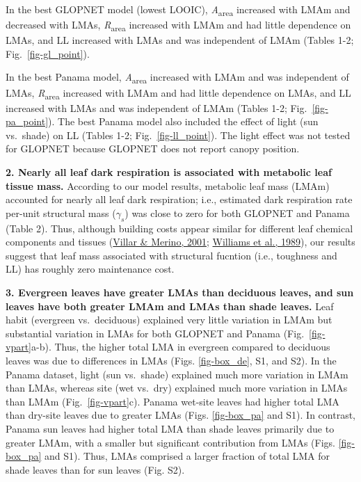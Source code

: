 \documentclass[
  12pt,
  letterpaper,
  DIV=11,
  numbers=noendperiod]{scrartcl}
\begin{document}
In the best GLOPNET model (lowest LOOIC), \emph{A}\textsubscript{area}
increased with LMAm and decreased with LMAs,
\emph{R}\textsubscript{area} increased with LMAm and had little
dependence on LMAs, and LL increased with LMAs and was independent of
LMAm (Tables 1-2; Fig.~\ref{fig-gl_point}).

In the best Panama model, \emph{A}\textsubscript{area} increased with
LMAm and was independent of LMAs, \emph{R}\textsubscript{area} increased
with LMAm and had little dependence on LMAs, and LL increased with LMAs
and was independent of LMAm (Tables 1-2; Fig.~\ref{fig-pa_point}). The
best Panama model also included the effect of light (sun vs.~shade) on
LL (Tables 1-2; Fig.~\ref{fig-ll_point}). The light effect was not
tested for GLOPNET because GLOPNET does not report canopy position.

\textbf{2. Nearly all leaf dark respiration is associated with metabolic
leaf tissue mass.} According to our model results, metabolic leaf mass
(LMAm) accounted for nearly all leaf dark respiration; i.e., estimated
dark respiration rate per-unit structural mass (\(\gamma_s\)) was close
to zero for both GLOPNET and Panama (Table 2). Thus, although building
costs appear similar for different leaf chemical components and tissues
(\protect\hyperlink{ref-Villar2001}{Villar \& Merino, 2001};
\protect\hyperlink{ref-Williams1989}{Williams et al., 1989}), our
results suggest that leaf mass associated with structural fucntion
(i.e., toughness and LL) has roughly zero maintenance cost.

\textbf{3. Evergreen leaves have greater LMAs than deciduous leaves, and
sun leaves have both greater LMAm and LMAs than shade leaves.} Leaf
habit (evergreen vs.~deciduous) explained very little variation in LMAm
but substantial variation in LMAs for both GLOPNET and Panama
(Fig.~\ref{fig-vpart}a-b). Thus, the higher total LMA in evergreen
compared to deciduous leaves was due to differences in LMAs (Figs.
\ref{fig-box_de}, S1, and S2). In the Panama dataset, light (sun
vs.~shade) explained much more variation in LMAm than LMAs, whereas site
(wet vs.~dry) explained much more variation in LMAs than LMAm
(Fig.~\ref{fig-vpart}c). Panama wet-site leaves had higher total LMA
than dry-site leaves due to greater LMAs (Figs. \ref{fig-box_pa} and
S1). In contrast, Panama sun leaves had higher total LMA than shade
leaves primarily due to greater LMAm, with a smaller but significant
contribution from LMAs (Figs. \ref{fig-box_pa} and S1). Thus, LMAs
comprised a larger fraction of total LMA for shade leaves than for sun
leaves (Fig. S2).
\end{document}
